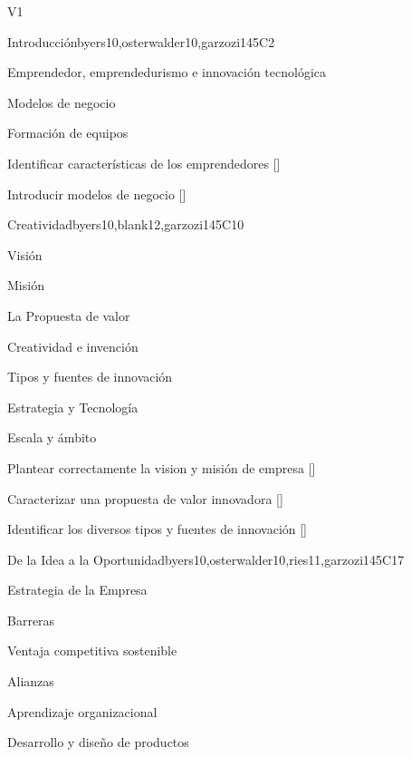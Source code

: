 \begin{syllabus}
\begin{competences}{V1}
   \end{competences}
   
   \begin{unit}{}{Introducción}{byers10,osterwalder10,garzozi14}{5}{C2}
   \begin{topics}
         \item Emprendedor, emprendedurismo e innovación tecnológica
         \item Modelos de negocio
         \item Formación de equipos
      \end{topics}
   
       \begin{learningoutcomes} 
         \item Identificar características de los emprendedores  [\Familiarity]
         \item Introducir modelos de negocio  [\Familiarity]
       \end{learningoutcomes} 
   \end{unit}
   
   \begin{unit}{}{Creatividad}{byers10,blank12,garzozi14}{5}{C10}
   \begin{topics}
         \item Visión
         \item Misión
         \item La Propuesta de valor
         \item Creatividad e invención
         \item Tipos y fuentes de innovación
         \item Estrategia y Tecnología
         \item Escala y ámbito
      \end{topics}
   
       \begin{learningoutcomes} 
         \item Plantear correctamente la vision y misión de empresa  [\Usage]
        \item Caracterizar una propuesta de valor innovadora  [\Assessment]
         \item Identificar los diversos tipos y fuentes de innovación  [\Familiarity]
      \end{learningoutcomes} 
   \end{unit}
   
   \begin{unit}{}{De la Idea a la Oportunidad}{byers10,osterwalder10,ries11,garzozi14}{5}{C17}
   \begin{topics}
         \item Estrategia de la Empresa
         \item Barreras 
         \item Ventaja competitiva sostenible
         \item Alianzas
         \item Aprendizaje organizacional
         \item Desarrollo y diseño de productos
      \end{topics}
   

\end{unit}
\end{syllabus}
